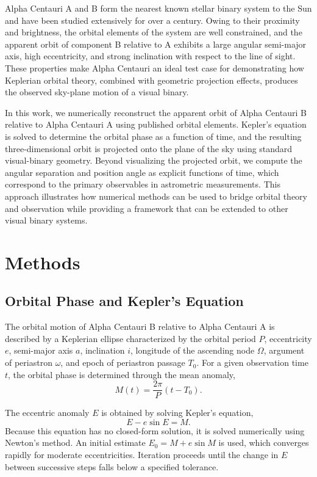 \documentclass[11pt]{article}
\begin{document}
Alpha Centauri A and B form the nearest known stellar binary system to the Sun and have been studied extensively for over a century. Owing to their proximity and brightness, the orbital elements of the system are well constrained, and the apparent orbit of component B relative to A exhibits a large angular semi-major axis, high eccentricity, and strong inclination with respect to the line of sight. These properties make Alpha Centauri an ideal test case for demonstrating how Keplerian orbital theory, combined with geometric projection effects, produces the observed sky-plane motion of a visual binary.

In this work, we numerically reconstruct the apparent orbit of Alpha Centauri B relative to Alpha Centauri A using published orbital elements. Kepler’s equation is solved to determine the orbital phase as a function of time, and the resulting three-dimensional orbit is projected onto the plane of the sky using standard visual-binary geometry. Beyond visualizing the projected orbit, we compute the angular separation and position angle as explicit functions of time, which correspond to the primary observables in astrometric measurements. This approach illustrates how numerical methods can be used to bridge orbital theory and observation while providing a framework that can be extended to other visual binary systems.


\section{Methods}

\subsection{Orbital Phase and Kepler’s Equation}
The orbital motion of Alpha Centauri B relative to Alpha Centauri A is described by a Keplerian ellipse characterized by the orbital period $P$, eccentricity $e$, semi-major axis $a$, inclination $i$, longitude of the ascending node $\Omega$, argument of periastron $\omega$, and epoch of periastron passage $T_0$. For a given observation time $t$, the orbital phase is determined through the mean anomaly,
\begin{equation}
M(t) = \frac{2\pi}{P}(t - T_0).
\end{equation}

The eccentric anomaly $E$ is obtained by solving Kepler’s equation,
\begin{equation}
E - e \sin E = M.
\end{equation}
Because this equation has no closed-form solution, it is solved numerically using Newton’s method. An initial estimate $E_0 = M + e \sin M$ is used, which converges rapidly for moderate eccentricities. Iteration proceeds until the change in $E$ between successive steps falls below a specified tolerance.
\end{document}
